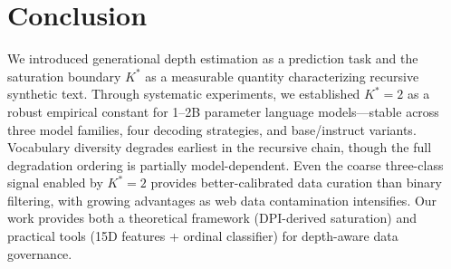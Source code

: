 \documentclass[11pt,a4paper]{article}
\begin{document}
\section{Conclusion}

We introduced generational depth estimation as a prediction task and the saturation boundary $K^*$ as a measurable quantity characterizing recursive synthetic text. Through systematic experiments, we established $K^*=2$ as a robust empirical constant for 1--2B parameter language models---stable across three model families, four decoding strategies, and base/instruct variants. Vocabulary diversity degrades earliest in the recursive chain, though the full degradation ordering is partially model-dependent. Even the coarse three-class signal enabled by $K^*=2$ provides better-calibrated data curation than binary filtering, with growing advantages as web data contamination intensifies. Our work provides both a theoretical framework (DPI-derived saturation) and practical tools (15D features + ordinal classifier) for depth-aware data governance.
\end{document}
